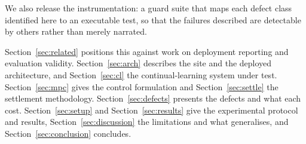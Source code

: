 We also release the instrumentation: a guard suite that maps each defect class
identified here to an executable test, so that the failures described are
detectable by others rather than merely narrated.

Section~\ref{sec:related} positions this against work on deployment reporting
and evaluation validity. Section~\ref{sec:arch} describes the site and the
deployed architecture, and Section~\ref{sec:cl} the continual-learning system
under test. Section~\ref{sec:mpc} gives the control formulation and
Section~\ref{sec:settle} the settlement methodology.
Section~\ref{sec:defects} presents the defects and what each cost.
Section~\ref{sec:setup} and Section~\ref{sec:results} give the experimental
protocol and results, Section~\ref{sec:discussion} the limitations and what
generalises, and Section~\ref{sec:conclusion} concludes.
